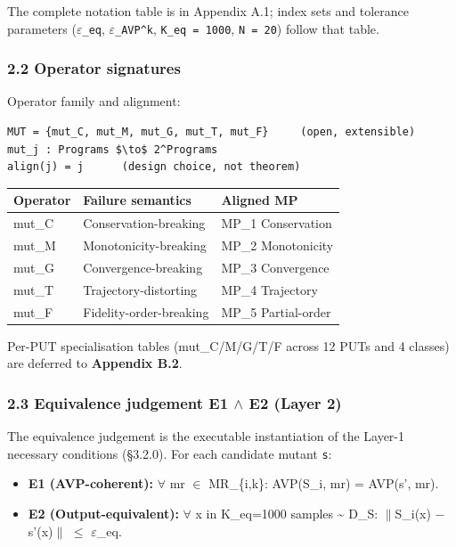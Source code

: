 \documentclass[review,12pt,authoryear]{elsarticle}
\providecommand{\tightlist}{\setlength{\itemsep}{0pt}\setlength{\parskip}{0pt}}
\newcounter{none}                   %
\begin{document}
The complete notation table is in Appendix A.1; index sets and tolerance
parameters (\texttt{$\varepsilon$\_eq}, \texttt{$\varepsilon$\_AVP\^{}k},
\texttt{K\_eq\ =\ 1000}, \texttt{N\ =\ 20}) follow that table.

\subsubsection{2.2 Operator signatures}\label{operator-signatures}

Operator family and alignment:

\begin{verbatim}
MUT = {mut_C, mut_M, mut_G, mut_T, mut_F}     (open, extensible)
mut_j : Programs $\to$ 2^Programs
align(j) = j      (design choice, not theorem)
\end{verbatim}

{\def\LTcaptype{none} %
\begin{longtable}[]{@{}lll@{}}
\toprule\noalign{}
Operator & Failure semantics & Aligned MP \\
\midrule\noalign{}
\endhead
\bottomrule\noalign{}
\endlastfoot
mut\_C & Conservation-breaking & MP\_1 Conservation \\
mut\_M & Monotonicity-breaking & MP\_2 Monotonicity \\
mut\_G & Convergence-breaking & MP\_3 Convergence \\
mut\_T & Trajectory-distorting & MP\_4 Trajectory \\
mut\_F & Fidelity-order-breaking & MP\_5 Partial-order \\
\end{longtable}
}

Per-PUT specialisation tables (mut\_C/M/G/T/F across 12 PUTs and 4
classes) are deferred to \textbf{Appendix B.2}.

\subsubsection{2.3 Equivalence judgement E1 $\wedge$ E2 (Layer
2)}\label{equivalence-judgement-e1-e2-layer-2}

The equivalence judgement is the executable instantiation of the Layer-1
necessary conditions (§3.2.0). For each candidate mutant
\texttt{s\textquotesingle{}}:

\begin{itemize}
\tightlist
\item
  \textbf{E1 (AVP-coherent):} $\forall$ mr $\in$ MR\_\{i,k\}: AVP(S\_i, mr) =
  AVP(s', mr).
\item
  \textbf{E2 (Output-equivalent):} $\forall$ x in K\_eq=1000 samples
  \textasciitilde{} D\_S: $\|$S\_i(x) − s'(x)$\|$ $\leq$ $\varepsilon$\_eq.
\end{itemize}
\end{document}
